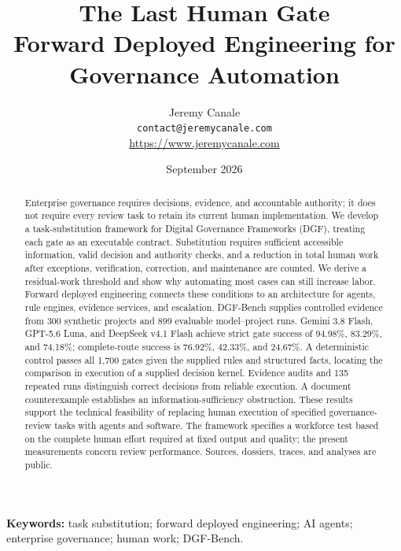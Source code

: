 \documentclass[11pt,a4paper]{article}
\title{\textbf{The Last Human Gate}\\[0.4em]
\large Forward Deployed Engineering for Governance Automation}
\author{Jeremy Canale\\\normalsize\texttt{contact@jeremycanale.com}\\
\normalsize\url{https://www.jeremycanale.com}}
\date{September 2026}
\begin{document}
\maketitle
\begin{abstract}
Enterprise governance requires decisions, evidence, and accountable authority; it does not
require every review task to retain its current human implementation. We develop a task-substitution
framework for Digital Governance Frameworks (DGF), treating each gate as an executable contract.
Substitution requires sufficient accessible information, valid decision and authority checks, and
a reduction in total human work after exceptions, verification, correction, and maintenance are
counted. We derive a residual-work threshold and show why automating most cases can still
increase labor. Forward deployed engineering connects these conditions to an architecture for
agents, rule engines, evidence services, and escalation. DGF-Bench supplies controlled evidence
from 300 synthetic projects and 899 evaluable model--project runs. Gemini 3.8 Flash, GPT-5.6 Luna,
and DeepSeek v4.1 Flash achieve strict gate success of 94.98\%, 83.29\%, and 74.18\%; complete-route
success is 76.92\%, 42.33\%, and 24.67\%. A deterministic control passes all 1,700 gates given
the supplied rules and structured facts, locating the comparison in execution of a supplied
decision kernel. Evidence audits and 135 repeated runs distinguish
correct decisions from reliable execution. A document counterexample establishes an
information-sufficiency obstruction. These results support the technical feasibility of
replacing human execution of specified governance-review tasks with agents and software.
The framework specifies a workforce test based on the complete human effort required at fixed
output and quality; the present measurements concern review performance. Sources, dossiers,
traces, and analyses are public.
\end{abstract}
\noindent\textbf{Keywords:} task substitution; forward deployed engineering; AI agents; enterprise governance; human work; DGF-Bench.









\clearpage

\clearpage
{\small}
\end{document}
